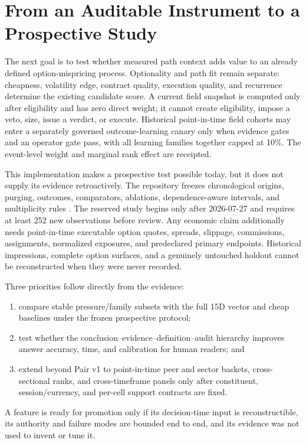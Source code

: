 \documentclass{article}
\begin{document}
\section{From an Auditable Instrument to a Prospective Study}
\label{sec:options}

The next goal is to test whether measured path context adds value to an already defined option-mispricing process. Optionality and path fit remain separate: cheapness, volatility edge, contract quality, execution quality, and recurrence determine the existing candidate score. A current field snapshot is computed only after eligibility and has zero direct weight; it cannot create eligibility, impose a veto, size, issue a verdict, or execute. Historical point-in-time field cohorts may enter a separately governed outcome-learning canary only when evidence gates and an operator gate pass, with all learning families together capped at 10\%. The event-level weight and marginal rank effect are receipted.

This implementation makes a prospective test possible today, but it does not supply its evidence retroactively. The repository freezes chronological origins, purging, outcomes, comparators, ablations, dependence-aware intervals, and multiplicity rules \citep{lopezdeprado2018advances,politisromano1994stationary}. The reserved study begins only after 2026-07-27 and requires at least 252 new observations before review. Any economic claim additionally needs point-in-time executable option quotes, spreads, slippage, commissions, assignments, normalized exposures, and predeclared primary endpoints. Historical impressions, complete option surfaces, and a genuinely untouched holdout cannot be reconstructed when they were never recorded.

Three priorities follow directly from the evidence:
\begin{enumerate}
    \item compare stable pressure/family subsets with the full 15D vector and cheap baselines under the frozen prospective protocol;
    \item test whether the conclusion--evidence--definition--audit hierarchy improves answer accuracy, time, and calibration for human readers; and
    \item extend beyond Pair v1 to point-in-time peer and sector baskets, cross-sectional ranks, and cross-timeframe panels only after constituent, session/currency, and per-cell support contracts are fixed.
\end{enumerate}
A feature is ready for promotion only if its decision-time input is reconstructible, its authority and failure modes are bounded end to end, and its evidence was not used to invent or tune it.
\end{document}

